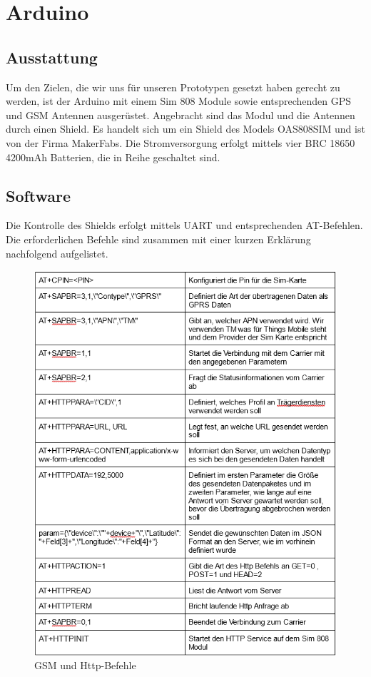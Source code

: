 \section{Arduino}
\subsection{Ausstattung}
Um den Zielen, die wir uns für unseren Prototypen gesetzt haben gerecht zu werden, ist der Arduino mit einem Sim 808 Module sowie entsprechenden GPS und GSM Antennen ausgerüstet.
Angebracht sind das Modul und die Antennen durch einen Shield. Es handelt sich um ein Shield des Models OAS808SIM und ist von der Firma MakerFabs.
Die Stromversorgung erfolgt mittels vier BRC 18650 4200mAh Batterien, die in Reihe geschaltet sind. 
\subsection{Software}
Die Kontrolle des Shields erfolgt mittels UART und entsprechenden AT-Befehlen. Die erforderlichen Befehle sind zusammen mit einer kurzen Erklärung nachfolgend aufgelistet.

\begin{figure} [H]
 \begin{center}
		\includegraphics[width=1\textwidth]{Bilder/Arduino_Befehlstabelle_1.png}
		\caption{GSM und Http-Befehle}
		\label{Gsm_http}
	\end{center}
\end{figure}

